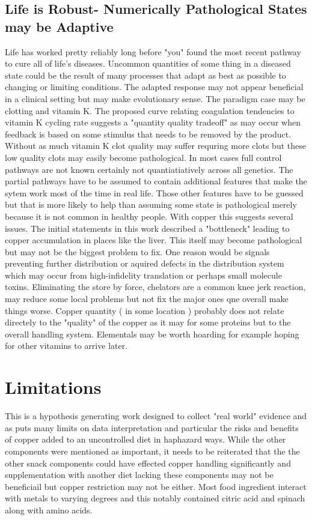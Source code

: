 \subsection{Life is Robust- Numerically Pathological States may be Adaptive }
Life has worked pretty reliably long before "you" found the
most recent pathway to cure all of life's diseases.
Uncommon quantities of some thing in a diseased state could be the
result of many processes that adapt as best as possible to changing
or limiting conditions. The adapted response may not appear beneficial
in a clinical setting but may make evolutionary sense. 
The paradigm case may be clotting and vitamin K. The proposed
curve relating coagulation tendencies to vitamin K cycling rate
\cite{marchywka-MJM-2022-015-0.20c}
suggests a "quantity quality tradeoff" as may occur when feedback
is based on some stimulus that needs to be removed by the product.
Without as much vitamin K clot quality may suffer requring 
more clots but these low quality clots may easily become pathological.
In most cases full control pathways are not known certainly
not quantiatiatively across all genetics. The partial pathways
have to be assumed to contain additional features
that make the sytem work most of the time in real life.
Those other features have to be guessed but that is more likely
to help than assuming some state is pathological merely
because it is not common in healthy people.
With copper this suggests several issues. The initial statements
in this work described a "bottleneck" leading
to copper accumulation in places like the liver. This itself
may become pathological but may not be the biggest problem
to fix. One reason would be signals preventing further distribution
or aquired defects in the distribution system which may occur 
from high-infidelity translation or perhaps small molecule toxins.  
Eliminating the store by force, chelators are a common knee
jerk reaction,  may reduce some local problems but not fix the
major ones qne overall make things worse. 
Copper quantity ( in some location ) probably does not relate
directely to the "quality" of the copper as it may for some
proteins but to the overall handling system. Elementals may be
worth hoarding for example hoping for other vitamins to arrive
later. 

\section{Limitations}
This is a hypothesis generating work designed to collect
"real world" evidence and as puts many limits on data interpretation
and particular the risks and benefits of copper added to an uncontrolled
diet in haphazard ways.
While the other components were mentioned as important,
it needs to be reiterated that the 
the other snack components could have effected copper handling
significantly and supplementation with another diet lacking
these components may not be beneficiail but copper restriction
may not be either. Most food ingredient interact with metals 
to varying degrees and this notably contained citric acid
and spinach along with amino acids. 


